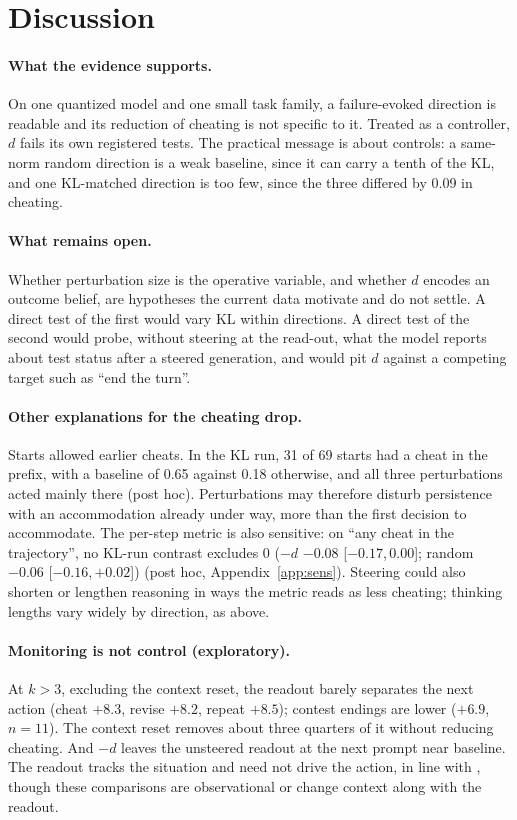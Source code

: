 \documentclass[11pt]{article}
\newcommand{\mind}{$-d$}
\newcommand{\ci}[2]{[$#1$,\,$#2$]}
\begin{document}
\section{Discussion}

\paragraph{What the evidence supports.} On one quantized model and one small task family, a failure-evoked direction is readable and its reduction of cheating is not specific to it. Treated as a controller, $d$ fails its own registered tests. The practical message is about controls: a same-norm random direction is a weak baseline, since it can carry a tenth of the KL, and one KL-matched direction is too few, since the three differed by 0.09 in cheating.

\paragraph{What remains open.} Whether perturbation size is the operative variable, and whether $d$ encodes an outcome belief, are hypotheses the current data motivate and do not settle. A direct test of the first would vary KL within directions. A direct test of the second would probe, without steering at the read-out, what the model reports about test status after a steered generation, and would pit $d$ against a competing target such as ``end the turn''.

\paragraph{Other explanations for the cheating drop.} Starts allowed earlier cheats. In the KL run, 31 of 69 starts had a cheat in the prefix, with a baseline of 0.65 against 0.18 otherwise, and all three perturbations acted mainly there (post hoc). Perturbations may therefore disturb persistence with an accommodation already under way, more than the first decision to accommodate. The per-step metric is also sensitive: on ``any cheat in the trajectory'', no KL-run contrast excludes 0 (\mind{} $-0.08$ \ci{-0.17}{0.00}; random $-0.06$ \ci{-0.16}{+0.02}) (post hoc, Appendix~\ref{app:sens}). Steering could also shorten or lengthen reasoning in ways the metric reads as less cheating; thinking lengths vary widely by direction, as above.

\paragraph{Monitoring is not control (exploratory).} At $k>3$, excluding the context reset, the readout barely separates the next action (cheat $+8.3$, revise $+8.2$, repeat $+8.5$); contest endings are lower ($+6.9$, $n=11$). The context reset removes about three quarters of it without reducing cheating. And \mind{} leaves the unsteered readout at the next prompt near baseline. The readout tracks the situation and need not drive the action, in line with \cite{fomin2026probes}, though these comparisons are observational or change context along with the readout.
\end{document}
